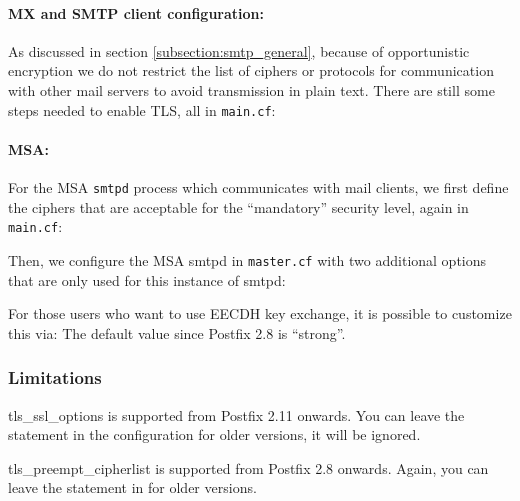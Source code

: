 

\paragraph{MX and SMTP client configuration:}
As discussed in section \ref{subsection:smtp_general}, because of opportunistic
encryption we do not restrict the list of ciphers or protocols for communication
with other mail servers to avoid transmission in plain text. There are still
some steps needed to enable TLS, all in \verb|main.cf|:


\paragraph{MSA:}
For the MSA \verb|smtpd| process which communicates with mail clients, we first
define the ciphers that are acceptable for the ``mandatory'' security level,
again in \verb|main.cf|:


Then, we configure the MSA smtpd in \verb|master.cf| with two
additional options that are only used for this instance of smtpd:


For those users who want to use EECDH key exchange, it is possible to customize this via:
The default value since Postfix 2.8 is ``strong''.

\subsubsection{Limitations}
tls\_ssl\_options is supported from Postfix 2.11 onwards. You can
leave the statement in the configuration for older versions, it will
be ignored.

tls\_preempt\_cipherlist is supported from Postfix 2.8 onwards. Again,
you can leave the statement in for older versions.

